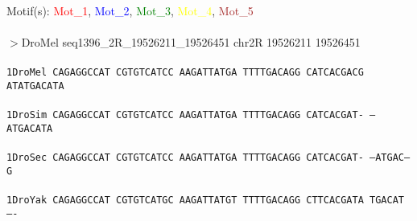 \documentclass[11pt,twoside,reqno,a4paper]{article}
\begin{document}
\noindent
\newlength{\charwidth}Motif(s): \textcolor{Red}{Mot\_1}, \textcolor{Blue}{Mot\_2}, \textcolor{Green}{Mot\_3}, \textcolor{Yellow}{Mot\_4}, \textcolor{Brown}{Mot\_5}\\
\\
$>$DroMel	seq1396\_2R\_19526211\_19526451	chr2R	19526211	19526451 \\
 \\
\texttt{1\hspace*{4\charwidth}DroMel	CAGAGGCCAT	CGTGTCATCC	AAGATTATGA	TTTTGACAGG	CATCACGACG	ATATGACATA	\\
\hspace*{5\charwidth}\hspace*{7\charwidth}\hspace*{1\charwidth}\hspace*{1\charwidth}\hspace*{1\charwidth}\hspace*{1\charwidth}\hspace*{1\charwidth}\hspace*{1\charwidth}\\
1\hspace*{4\charwidth}DroSim	CAGAGGCCAT	CGTGTCATCC	AAGATTATGA	TTTTGACAGG	CATCACGAT-	--ATGACATA	\\
\hspace*{5\charwidth}\hspace*{7\charwidth}\hspace*{1\charwidth}\hspace*{1\charwidth}\hspace*{1\charwidth}\hspace*{1\charwidth}\hspace*{1\charwidth}\hspace*{1\charwidth}\\
1\hspace*{4\charwidth}DroSec	CAGAGGCCAT	CGTGTCATCC	AAGATTATGA	TTTTGACAGG	CATCACGAT-	--ATGAC--G	\\
\hspace*{5\charwidth}\hspace*{7\charwidth}\hspace*{1\charwidth}\hspace*{1\charwidth}\hspace*{1\charwidth}\hspace*{1\charwidth}\hspace*{1\charwidth}\hspace*{1\charwidth}\\
1\hspace*{4\charwidth}DroYak	CAGAGGCCAT	CGTGTCATGC	AAGATTATGT	TTTTGACAGG	CTTCACGATA	TGACAT----	\\
}
\end{document}
